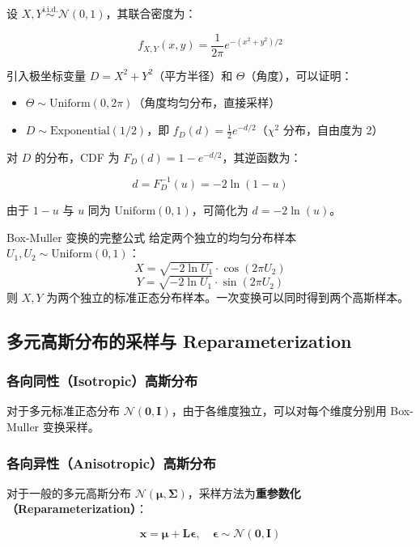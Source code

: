 设 $X, Y \overset{\text{i.i.d.}}{\sim} \mathcal{N}(0, 1)$，其联合密度为：

$$f_{X,Y}(x, y) = \frac{1}{2\pi} e^{-(x^2 + y^2)/2}$$

引入极坐标变量 $D = X^2 + Y^2$（平方半径）和 $\Theta$（角度），可以证明：

\begin{itemize}
    \item $\Theta \sim \text{Uniform}(0, 2\pi)$（角度均匀分布，直接采样）
    \item $D \sim \text{Exponential}(1/2)$，即 $f_D(d) = \frac{1}{2}e^{-d/2}$（$\chi^2$ 分布，自由度为 2）
\end{itemize}

对 $D$ 的分布，CDF 为 $F_D(d) = 1 - e^{-d/2}$，其逆函数为：

$$d = F_D^{-1}(u) = -2\ln(1 - u)$$

由于 $1-u$ 与 $u$ 同为 $\text{Uniform}(0,1)$，可简化为 $d = -2\ln(u)$。

\begin{importantbox}{Box-Muller 变换的完整公式}
给定两个独立的均匀分布样本 $U_1, U_2 \sim \text{Uniform}(0,1)$：
$$X = \sqrt{-2\ln U_1} \cdot \cos(2\pi U_2)$$
$$Y = \sqrt{-2\ln U_1} \cdot \sin(2\pi U_2)$$
则 $X, Y$ 为两个独立的标准正态分布样本。一次变换可以同时得到两个高斯样本。
\end{importantbox}

\subsection{多元高斯分布的采样与 Reparameterization}

\subsubsection{各向同性（Isotropic）高斯分布}

对于多元标准正态分布 $\mathcal{N}(\mathbf{0}, \mathbf{I})$，由于各维度独立，可以对每个维度分别用 Box-Muller 变换采样。

\subsubsection{各向异性（Anisotropic）高斯分布}

对于一般的多元高斯分布 $\mathcal{N}(\boldsymbol{\mu}, \boldsymbol{\Sigma})$，采样方法为\textbf{重参数化（Reparameterization）}：

$$\mathbf{x} = \boldsymbol{\mu} + \mathbf{L} \boldsymbol{\epsilon}, \quad \boldsymbol{\epsilon} \sim \mathcal{N}(\mathbf{0}, \mathbf{I})$$

